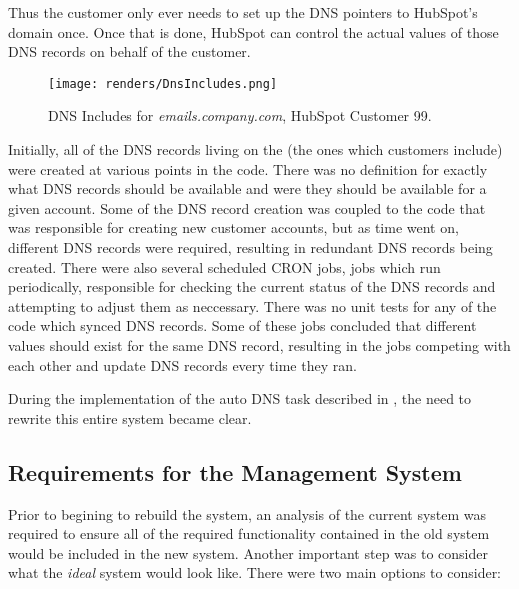 Thus the customer only ever needs to set up the DNS pointers to HubSpot's domain once. Once that is done, HubSpot can control the actual values of those DNS records on behalf of the customer. 

\begin{figure}[H]
      \centering
      \texttt{[image: renders/DnsIncludes.png]}
      \caption{DNS Includes for \textit{emails.company.com}, HubSpot Customer 99.}
      \label{fig:dnsIncludes}
\end{figure}

Initially, all of the DNS records living on the  (the ones which customers include) were created at various points in the code. There was no definition for exactly what DNS records should be available and were they should be available for a given account. Some of the DNS record creation was coupled to the code that was responsible for creating new customer accounts, but as time went on, different DNS records were required, resulting in redundant DNS records being created. There were also several scheduled CRON jobs, jobs which run periodically, responsible for checking the current status of the DNS records and attempting to adjust them as neccessary. There was no unit tests for any of the code which synced DNS records. Some of these jobs concluded that different values should exist for the same DNS record, resulting in the jobs competing with each other and update DNS records every time they ran.

During the implementation of the auto DNS task described in , the need to rewrite this entire system became clear. 

\subsection{Requirements for the Management System}
Prior to begining to rebuild the system, an analysis of the current system was required to ensure all of the required functionality contained in the old system would be included in the new system. Another important step was to consider what the \textit{ideal} system would look like. There were two main options to consider:

